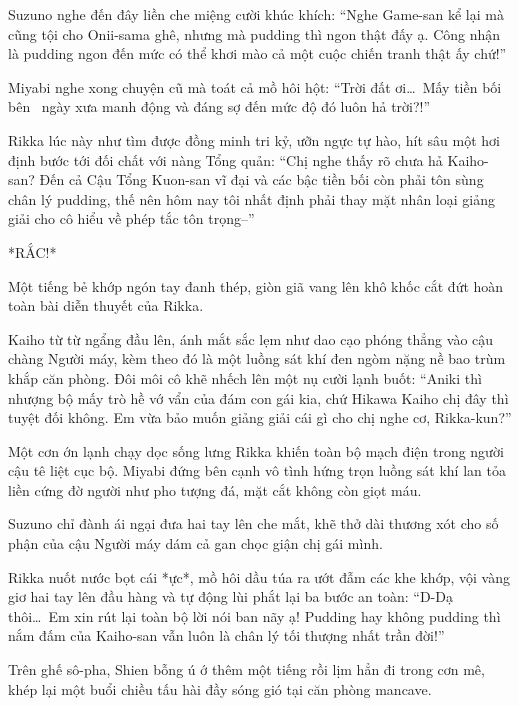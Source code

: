 \documentclass[../main.tex]{subfiles}
\begin{document}
Suzuno nghe đến đây liền che miệng cười khúc khích: ``Nghe Game-san kể lại mà cũng tội cho Onii-sama ghê, nhưng mà pudding thì ngon thật đấy ạ. Công nhận là pudding ngon đến mức có thể khơi mào cả một cuộc chiến tranh thật ấy chứ!''

Miyabi nghe xong chuyện cũ mà toát cả mồ hôi hột: ``Trời đất ơi\dots\ Mấy tiền bối bên \hll\ ngày xưa manh động và đáng sợ đến mức độ đó luôn hả trời?!''

Rikka lúc này như tìm được đồng minh tri kỷ, ưỡn ngực tự hào, hít sâu một hơi định bước tới đối chất với nàng Tổng quản: ``Chị nghe thấy rõ chưa hả Kaiho-san? Đến cả Cậu Tổng Kuon-san vĩ đại và các bậc tiền bối còn phải tôn sùng chân lý pudding, thế nên hôm nay tôi nhất định phải thay mặt nhân loại giảng giải cho cô hiểu về phép tắc tôn trọng--''

*RẮC!*

Một tiếng bẻ khớp ngón tay đanh thép, giòn giã vang lên khô khốc cắt đứt hoàn toàn bài diễn thuyết của Rikka.

Kaiho từ từ ngẩng đầu lên, ánh mắt sắc lẹm như dao cạo phóng thẳng vào cậu chàng Người máy, kèm theo đó là một luồng sát khí đen ngòm nặng nề bao trùm khắp căn phòng. Đôi môi cô khẽ nhếch lên một nụ cười lạnh buốt: ``Aniki thì nhượng bộ mấy trò hề vớ vẩn của đám con gái kia, chứ Hikawa Kaiho chị đây thì tuyệt đối không. Em vừa bảo muốn giảng giải cái gì cho chị nghe cơ, Rikka-kun?''

Một cơn ớn lạnh chạy dọc sống lưng Rikka khiến toàn bộ mạch điện trong người cậu tê liệt cục bộ. Miyabi đứng bên cạnh vô tình hứng trọn luồng sát khí lan tỏa liền cứng đờ người như pho tượng đá, mặt cắt không còn giọt máu.

Suzuno chỉ đành ái ngại đưa hai tay lên che mắt, khẽ thở dài thương xót cho số phận của cậu Người máy dám cả gan chọc giận chị gái mình.

Rikka nuốt nước bọt cái *ực*, mồ hôi dầu túa ra ướt đẫm các khe khớp, vội vàng giơ hai tay lên đầu hàng và tự động lùi phắt lại ba bước an toàn: ``D-Dạ thôi\dots\ Em xin rút lại toàn bộ lời nói ban nãy ạ! Pudding hay không pudding thì nắm đấm của Kaiho-san vẫn luôn là chân lý tối thượng nhất trần đời!''

Trên ghế sô-pha, Shien bỗng ú ớ thêm một tiếng rồi lịm hẳn đi trong cơn mê, khép lại một buổi chiều tấu hài đầy sóng gió tại căn phòng mancave.
\end{document}
